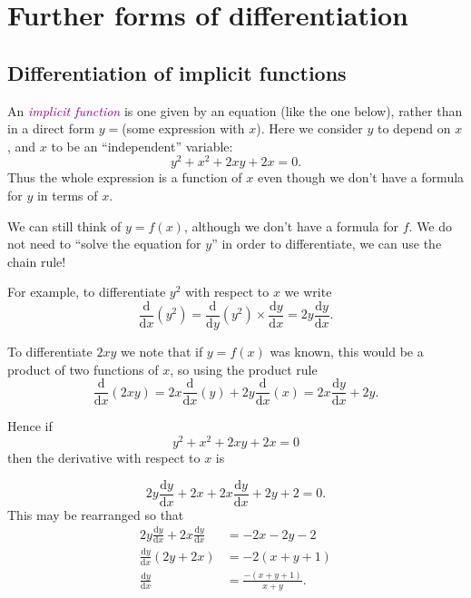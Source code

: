 \documentclass[
  english,
  11pt,
  oneside]{book}
\newcommand{\slide}{}
\theoremstyle{definition}
\theoremstyle{definition}
\theoremstyle{definition}
\theoremstyle{definition}
\theoremstyle{remark}
\begin{document}
\section{Further forms of differentiation}\label{further-forms-of-differentiation}

\subsection{Differentiation of implicit functions}\label{differentiation-of-implicit-functions}

An \textcolor{purple}{\em implicit function} is one given by an equation (like the one below), rather than in a direct form \(y=\)(some expression with \(x\)). Here we consider \(y\) to depend on \(x\), and \(x\) to be an ``independent'' variable:
\[
y^2 + x^2 + 2xy + 2x = 0.
\]
Thus the whole expression is a function of \(x\) even though we don't have a formula for \(y\) in terms of \(x\).

We can still think of \(y=f(x)\), although we don't have a formula for \(f\). We do not need to ``solve the equation for \(y\)'' in order to differentiate, we can use the chain rule!

\slide

For example, to differentiate \(y^2\) with respect to \(x\) we write
\[
\frac{\mathrm{d}}{\mathrm{d} x}(y^2) = \frac{\mathrm{d}}{\mathrm{d} y}(y^2)\times\frac{\mathrm{d} y}{\mathrm{d} x}= 2y\frac{\mathrm{d} y}{\mathrm{d} x}.
\]
\slide
To differentiate \(2xy\) we note that if \(y=f(x)\) was known, this would be a product of two functions of \(x\), so using the product rule
\[
\frac{\mathrm{d}}{\mathrm{d} x}(2xy) = 2x\frac{\mathrm{d}}{\mathrm{d} x}(y)+2y\frac{\mathrm{d}}{\mathrm{d} x}(x) = 2x\frac{\mathrm{d} y}{\mathrm{d} x} + 2y.
\]
\slide
Hence if
\[
y^2 + x^2 + 2xy + 2x = 0
\]
then the derivative with respect to \(x\) is

\begin{notslides}

\[
2y\frac{\mathrm{d} y}{\mathrm{d} x} + 2x+2x\frac{\mathrm{d} y}{\mathrm{d} x} +2y+2 = 0.
\]
This may be rearranged so that
\begin{align*}
2y\frac{\mathrm{d} y}{\mathrm{d} x}+2x\frac{\mathrm{d} y}{\mathrm{d} x} &= -2x-2y-2\\
\frac{\mathrm{d} y}{\mathrm{d} x}(2y+2x) &= -2(x+y+1)\\
\frac{\mathrm{d} y}{\mathrm{d} x} &= \frac{-(x+y+1)}{x+y}.
\end{align*}

\end{notslides}
\end{document}
